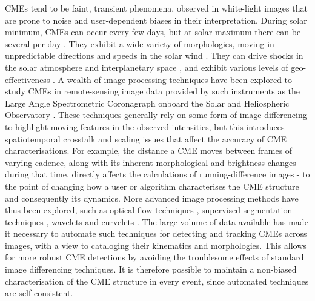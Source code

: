 \documentclass[referee,a4paper,12pt,traditabstract]{swsc}
\begin{document}
\begin{linenumbers}
CMEs tend to be faint, transient phenomena, observed in white-light images that are prone to noise and user-dependent biases in their interpretation. During solar minimum, CMEs can occur every few days, but at solar maximum there can be several per day \citep{2000JGR...10518169S, 2004JGRA..10907105Y}. They exhibit a wide variety of morphologies, moving in unpredictable directions and speeds in the solar wind \citep{angeo-27-4491-2009, 2010NatCo...1E..74B, 2014NatCo...5E3481L}. They can drive shocks in the solar atmosphere and interplanetary space \citep{2005A&A...440..373H, 2013NatPh...9..811C}, and exhibit various levels of geo-effectiveness \citep{2001JASTP..63..389P, 2005AnGeo..23.1033S, 2009GeoRL..3608102D, 2012SoPh..tmp...47L}. A wealth of image processing techniques have been explored to study CMEs in remote-sensing image data provided by such instruments as the Large Angle Spectrometric Coronagraph \citep[LASCO;][]{1995SoPh..162..357B} onboard the Solar and Heliospheric Observatory \citep[SOHO;][]{1995SoPh..162....1D}. These techniques generally rely on some form of image differencing to highlight moving features in the observed intensities, but this introduces spatiotemporal crosstalk and scaling issues that affect the accuracy of CME characterisations. For example, the distance a CME moves between frames of varying cadence, along with its inherent morphological and brightness changes during that time, directly affects the calculations of running-difference images - to the point of changing how a user or algorithm characterises the CME structure and consequently its dynamics. More advanced image processing methods have thus been explored, such as optical flow techniques \citep{2006ApJ...652.1747C}, supervised segmentation techniques \citep{Goussies:2010:DTC:1749630.1750150}, wavelets \citep{2003A&A...398.1185S} and curvelets \citep{2011AdSpR..47.2118G}. The large volume of data available has made it necessary to automate such techniques for detecting and tracking CMEs across images, with a view to cataloging their kinematics and morphologies. This allows for more robust CME detections by avoiding the troublesome effects of standard image differencing techniques. It is therefore possible to maintain a non-biased characterisation of the CME structure in every event, since automated techniques are self-consistent.


\end{linenumbers}
\end{document}
